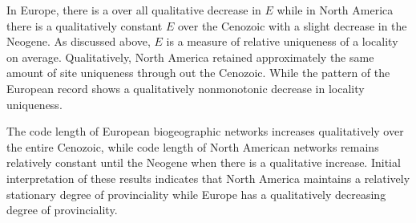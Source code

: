 \documentclass[12pt,letterpaper]{article}
\begin{document}
In Europe, there is a over all qualitative decrease in \(E\) while in North America there is a qualitatively constant \(E\) over the Cenozoic with a slight decrease in the Neogene. As discussed above, \(E\) is a measure of relative uniqueness of a locality on average. Qualitatively, North America retained approximately the same amount of site uniqueness through out the Cenozoic. While the pattern of the European record shows a qualitatively nonmonotonic decrease in locality uniqueness.

The code length of European biogeographic networks increases qualitatively over the entire Cenozoic, while code length of North American networks remains relatively constant until the Neogene when there is a qualitative increase. Initial interpretation of these results indicates that North America maintains a relatively stationary degree of provinciality while Europe has a qualitatively decreasing degree of provinciality. 
\end{document}
